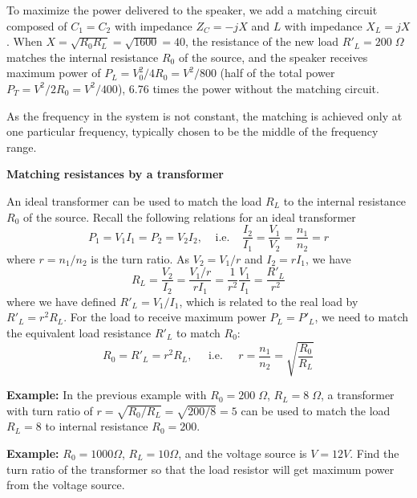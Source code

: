 \documentclass{article}
\begin{document}
To maximize the power delivered to the speaker, we add a matching circuit 
composed of $C_1=C_2$ with impedance $Z_C=-jX$ and $L$ with impedance 
$X_L=jX$. When $X=\sqrt{R_0R_L}=\sqrt{1600}=40$, the resistance of the new
load $R'_L=200\;\Omega$ matches the internal resistance $R_0$ of the source,
and the speaker receives maximum power of $P_L=V_0^2/4R_0=V^2/800$ (half of
the total power $P_T=V^2/2R_0=V^2/400$), 6.76 times the power without
the matching circuit. 

As the frequency in the system is not constant, the matching is achieved
only at one particular frequency, typically chosen to be the middle of
the frequency range. 

{\bf Matching resistances by a transformer}

An ideal transformer can be used to match the load $R_L$ to the internal 
resistance $R_0$ of the source. Recall the following relations for an ideal 
transformer
\begin{equation}
  P_1=V_1I_1=P_2=V_2I_2,\;\;\;\;\mbox{i.e.}\;\;\;\;
  \frac{I_2}{I_1}=\frac{V_1}{V_2}=\frac{n_1}{n_2}=r	
\end{equation}
where $r=n_1/n_2$ is the turn ratio. As $V_2=V_1/r$ and $I_2=rI_1$, we have 
\begin{equation} 
  R_L=\frac{V_2}{I_2}=\frac{V_1/r}{rI_1}=\frac{1}{r^2}\frac{V_1}{I_1}
  =\frac{R'_L}{r^2}
\end{equation}
where we have defined $R'_L=V_1/I_1$, which is related to the real load by
$R'_L=r^2 R_L$. For the load to receive maximum power $P_L=P'_L$, we need to 
match the equivalent load resistance $R'_L$ to match $R_0$:
\begin{equation} 
  R_0=R'_L=r^2 R_L,\;\;\;\;\;\mbox{i.e.}\;\;\;\;\;
  r=\frac{n_1}{n_2}=\sqrt{\frac{R_0}{R_L}} 
\end{equation}


{\bf Example:} In the previous example with $R_0=200\;\Omega$, 
$R_L=8\;\Omega$, a transformer with turn ratio of 
$r=\sqrt{R_0/R_L}=\sqrt{200/8}=5$ can be used to match the load
$R_L=8$ to internal resistance $R_0=200$.



{\bf Example:} $R_0=1000\Omega$, $R_L=10\Omega$, and the voltage 
source is $V=12V$. Find the turn ratio of the transformer so that 
the load resistor will get maximum power from the voltage source.
\end{document}
